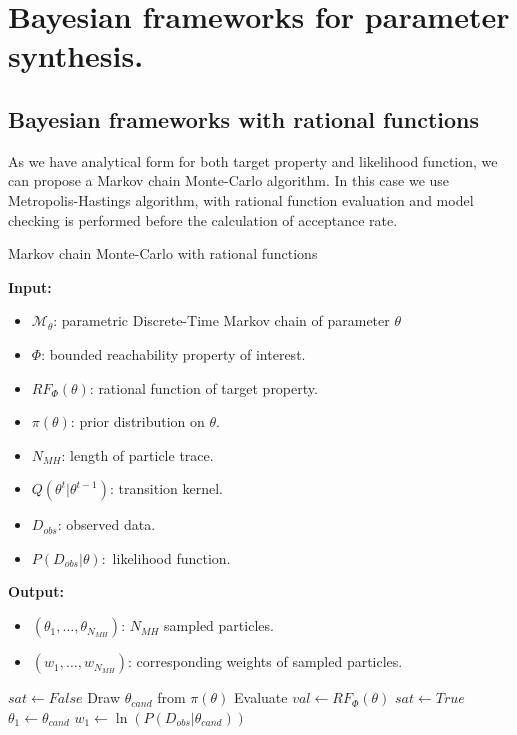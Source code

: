 \chapter{Bayesian frameworks for parameter synthesis.}

\section{Bayesian frameworks with rational functions}
\newpage
As we have analytical form for both target property and likelihood function, we can propose a Markov
chain Monte-Carlo algorithm. In this case we use Metropolis-Hastings algorithm, with rational
function evaluation and model checking is performed before the calculation of acceptance rate.
\begin{algorithm}[H]
    \caption{Markov chain Monte-Carlo with rational functions}
    \label{rf-mcmc-alg}
    \hspace*{\algorithmicindent} \textbf{Input:}
    \begin{itemize}
        \item $\mathcal{M}_\theta$: parametric Discrete-Time Markov chain of parameter $\theta$
        \item $\Phi$: bounded reachability property of interest.
        \item $RF_\Phi(\theta)$: rational function of target property.
        \item $\pi(\theta)$: prior distribution on $\theta$.
        \item $N_{MH}$: length of particle trace.
        \item $Q(\theta^t|\theta^{t-1})$: transition kernel.
        \item $D_{obs}$: observed data.
        \item $P(D_{obs}|\theta):$ likelihood function.
    \end{itemize}
    \hspace*{\algorithmicindent} \textbf{Output:}
    \begin{itemize}
        \item $(\theta_1,\ldots,\theta_{N_{MH}})$: $N_{MH}$ sampled particles.
        \item $(w_1,\ldots,w_{N_{MH}})$: corresponding weights of sampled particles.
    \end{itemize}
    \begin{algorithmic}[1]
        \State $sat \leftarrow False$
            \State Draw $\theta_{cand}$ from $\pi(\theta)$
            \State Evaluate $val \leftarrow RF_{\Phi}(\theta)$
                \State $sat \leftarrow True$
            \EndIf
        \EndWhile
        \State $\theta_1 \leftarrow  \theta_{cand}$
        \State $w_1 \leftarrow  \ln(P(D_{obs}|\theta_{cand}))$
\end{algorithmic}
\end{algorithm}

